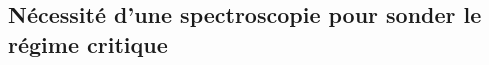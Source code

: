 \subsection{Nécessité d'une spectroscopie pour sonder le régime critique}
\lipsum[7]







\begin{comment}






Decision-making is vital for human and animal behaviors. It involves choosing an action or an option among multiples alternatives using different information such as sensory inputs, past associations and future goals. Decision-making has been studied in various fields, such as psychology, statistics, economics, finance, political science, philosophy, ethics and jurisprudence. %
The last two decades have seen a  surge of interest in the neurobiological studies of decision-making thanks to animal behavioral physiology, human brain imaging and neural circuit modelling. In this chapter I will review the neuronal underpinning of decision-making and different models that have been proposed. %
Finally, I will trouver la bonne formulation. %





\section{Decision-making in cognitive science and neuroscience}


\end{comment}
